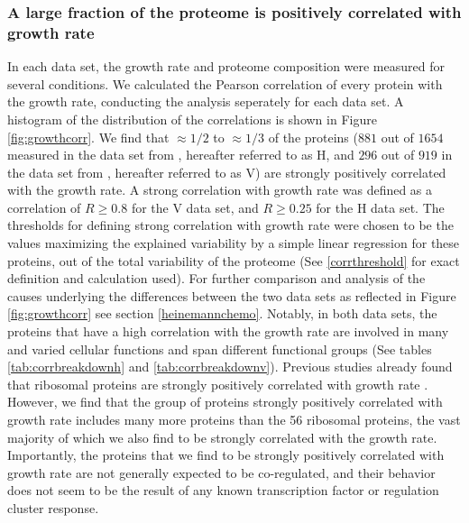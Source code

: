 \subsubsection{A large fraction of the proteome is positively correlated with growth rate}
In each data set, the growth rate and proteome composition were measured for several conditions.
We calculated the Pearson correlation of every protein with the growth rate, conducting the analysis seperately for each data set.
A histogram of the distribution of the correlations is shown in Figure \ref{fig:growthcorr}.
We find that $\approx 1/2$ to $\approx 1/3$ of the proteins ($881$ out of $1654$ measured in the data set from \cite{Heinemann2014}, hereafter referred to as H, and $296$ out of $919$ in the data set from \cite{Valgepea2013}, hereafter referred to as V) are strongly positively correlated with the growth rate.
A strong correlation with growth rate was defined as a correlation of $R\geq 0.8$ for the V data set, and $R\geq 0.25$ for the H data set.
The thresholds for defining strong correlation with growth rate were chosen to be the values maximizing the explained variability by a simple linear regression for these proteins, out of the total variability of the proteome (See \ref{corrthreshold} for exact definition and calculation used).
For further comparison and analysis of the causes underlying the differences between the two data sets as reflected in Figure \ref{fig:growthcorr} see section \ref{heinemannchemo}.
Notably, in both data sets, the proteins that have a high correlation with the growth rate are involved in many and varied cellular functions and span different functional groups (See tables \ref{tab:corrbreakdownh} and \ref{tab:corrbreakdownv}).
Previous studies already found that ribosomal proteins are strongly positively correlated with growth rate \cite{Pedersen1978a, ingraham1983growth, Klumpp2008}.
However, we find that the group of proteins strongly positively correlated with growth rate includes many more proteins than the 56 ribosomal proteins, the vast majority of which we also find to be strongly correlated with the growth rate.
Importantly, the proteins that we find to be strongly positively correlated with growth rate are not generally expected to be co-regulated, and their behavior does not seem to be the result of any known transcription factor or regulation cluster response.